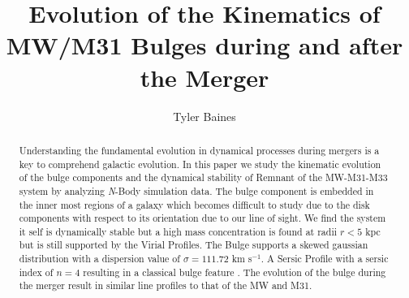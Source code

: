 \documentclass[iop]{emulateapj}
\begin{document}

\title{Evolution of the Kinematics of MW/M31 Bulges during and after the Merger}


\author{Tyler Baines}




\begin{abstract}
Understanding the fundamental evolution in dynamical processes during mergers is a key to comprehend galactic evolution. In this paper we study the kinematic evolution of the bulge components and the dynamical stability of Remnant of the MW-M31-M33 system by analyzing \textit{N}-Body simulation data. The bulge component is embedded in the inner most regions of a galaxy which becomes difficult to study due to the disk components with respect to its orientation due to our line of sight. We find the system it self is dynamically stable but a high mass concentration is found at radii $r<5$ kpc but is still supported by the Virial Profiles. The Bulge supports a skewed gaussian distribution with a dispersion value of $\sigma=111.72$ km s$^{-1}$. A Sersic Profile with a sersic index of $n=4$ resulting in a classical bulge feature . The evolution of the bulge during the merger result in similar line profiles to that of the MW and M31. 

\end{abstract}

\end{document}

